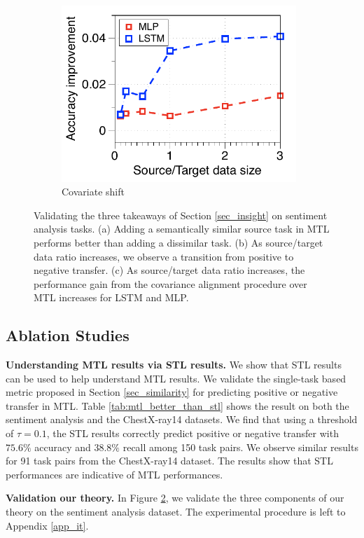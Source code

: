 \begin{figure}[!t]
\begin{subfigure}[b]{0.33\textwidth}
		\includegraphics[width=0.975\textwidth]{figures/ratio_alignment_norm_diff_all.pdf}
		\caption{Covariate shift}
		\label{fig_ab_cov}
	\end{subfigure}
	\caption{Validating the three takeaways of Section \ref{sec_insight} on sentiment analysis tasks. (a) Adding a semantically similar source task in MTL performs better than adding a dissimilar task.
	(b) As source/target data ratio increases, we observe a transition from positive to negative transfer.
	(c) As source/target data ratio increases, the performance gain from the covariance alignment procedure \cite{WZR20} over MTL increases for LSTM and MLP.}
	\label{fig_ablation}
	\vspace{-0.15in}
\end{figure}


\subsection{Ablation Studies}

\textbf{Understanding MTL results via STL results.}
We show that STL results can be used to help understand MTL results.
We validate the single-task based metric proposed in Section \ref{sec_similarity} for predicting positive or negative transfer in MTL.
Table \ref{tab:mtl_better_than_stl} shows the result on both the sentiment analysis and the ChestX-ray14 datasets.
We find that using a threshold of $\tau = 0.1$, the STL results correctly predict positive or negative transfer with $75.6\%$ accuracy and $38.8\%$ recall among 150 task pairs.
We observe similar results for 91 task pairs from the ChestX-ray14 dataset.
The results show that STL performances are indicative of MTL performances.

\textbf{Validation our theory.} In Figure \ref{fig_ablation}, we validate the three components of our theory on the sentiment analysis dataset.
The experimental procedure is left to Appendix \ref{app_it}.
